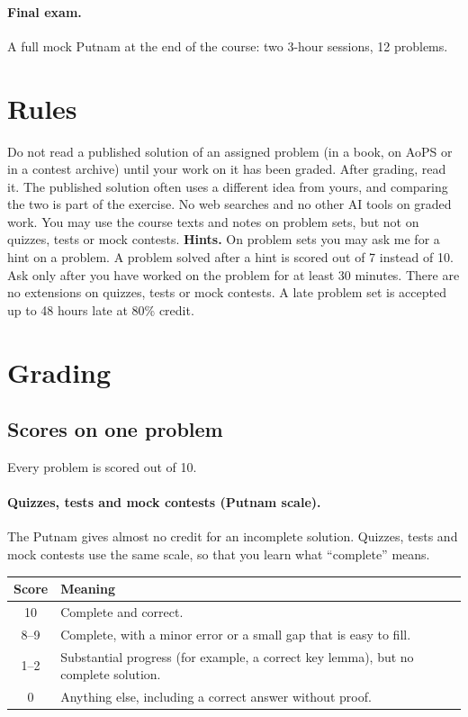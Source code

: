 \documentclass[11pt]{scrartcl}
\begin{document}
\paragraph{Final exam.}
A full mock Putnam at the end of the course: two 3-hour sessions, 12 problems.

\section{Rules}
\begin{enumerate}
  \ii Do not read a published solution of an assigned problem (in a book, on AoPS or in a
  contest archive) until your work on it has been graded. After grading, read it. The published
  solution often uses a different idea from yours, and comparing the two is part of the exercise.
  \ii No web searches and no other AI tools on graded work.
  You may use the course texts and notes on problem sets, but not on quizzes, tests or mock contests.
  \ii \textbf{Hints.} On problem sets you may ask me for a hint on a problem.
  A problem solved after a hint is scored out of 7 instead of 10.
  Ask only after you have worked on the problem for at least 30 minutes.
  \ii There are no extensions on quizzes, tests or mock contests. A late problem set is accepted up to
  48 hours late at 80\% credit.
\end{enumerate}

\section{Grading}\label{sec:grading}
\subsection{Scores on one problem}
Every problem is scored out of 10.

\paragraph{Quizzes, tests and mock contests (Putnam scale).}
The Putnam gives almost no credit for an incomplete solution. Quizzes, tests and mock contests use the same scale,
so that you learn what ``complete'' means.
\begin{center}
\begin{tabularx}{\linewidth}{cX}
  \toprule
  \textbf{Score} & \textbf{Meaning} \\
  \midrule
  10 & Complete and correct. \\
  8--9 & Complete, with a minor error or a small gap that is easy to fill. \\
  1--2 & Substantial progress (for example, a correct key lemma), but no complete solution. \\
  0 & Anything else, including a correct answer without proof. \\
  \bottomrule
\end{tabularx}
\end{center}
\end{document}
